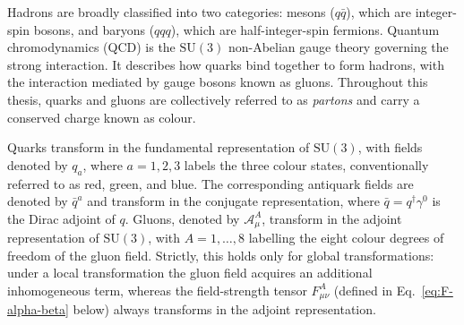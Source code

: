 Hadrons are broadly classified into two categories: mesons ($q\bar{q}$), which are 
integer-spin bosons, and baryons ($qqq$), which are half-integer-spin fermions. 
Quantum chromodynamics (QCD) is the $\mathrm{SU}(3)$ non-Abelian gauge theory 
governing the strong interaction. It describes how quarks bind together to form hadrons,
with the interaction mediated by gauge bosons known as gluons. Throughout this thesis, 
quarks and gluons are collectively referred to as \emph{partons} and carry a conserved 
charge known as colour. 

Quarks transform in the fundamental representation of $\mathrm{SU}(3)$,
with fields denoted by $q_a$, where $a=1,2,3$ labels the three colour
states, conventionally referred to as red, green, and blue. The corresponding
antiquark fields are denoted by $\bar{q}^a$ and transform in the conjugate
representation, where $\bar{q}=q^\dagger\gamma^0$ is the Dirac adjoint of
$q$. Gluons, denoted by $\mathcal{A}_\mu^A$, transform in the adjoint
representation of $\mathrm{SU}(3)$, with $A=1,\ldots,8$ labelling the eight
colour degrees of freedom of the gluon field. Strictly, this holds only for global transformations: under a
local transformation the gluon field acquires an additional inhomogeneous
term, whereas the field-strength tensor $F^A_{\mu\nu}$ (defined in Eq.~\eqref{eq:F-alpha-beta} below) always transforms
in the adjoint representation.
 
